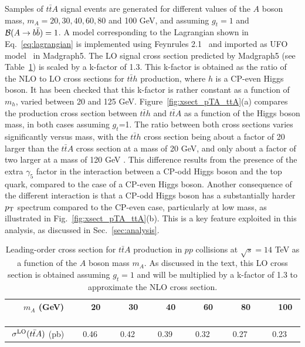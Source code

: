 \documentclass[preprintnumbers,superscriptaddress,nofootinbib,aps,prd,floatfix]{revtex4}
\newcommand{\pt}{p_{\rm{T}}}
\newcommand{\ttbar}{\ensuremath{t\bar{t}}}
\begin{document}
Samples of $\ttbar A$ signal events are generated for different values of the $A$ boson mass, $m_A = 20, 30,40, 60, 80$ and 100 GeV,
and assuming $g_t=1$ and ${\cal B}(A \to b\bar{b})=1$. A model corresponding to the Lagrangian shown in Eq.~\ref{eq:lagrangian} 
is implemented using Feynrules 2.1~\cite{Alloul:2013bka} and imported as UFO  model~\cite{Degrande:2011ua} in {\sc Madgraph5}.  
The LO signal cross section predicted by  {\sc Madgraph5} (see Table~\ref{tab:sigma_ttA}) is scaled by a k-factor of 1.3. This k-factor is obtained 
as the ratio of the NLO to LO cross sections for $\ttbar h$ production, where $h$ is a CP-even Higgs boson. It has been checked that this k-factor
is rather constant as a function of $m_h$, varied between 20 and 125 GeV.
Figure~\ref{fig:xsect_pTA_ttA}(a) compares the production cross section between $\ttbar h$ and $\ttbar A$ as a function of the Higgs boson
mass, in both cases assuming $g_t$=1. The ratio between both cross sections varies significantly versus mass, with the $\ttbar h$ cross section
being about a factor of 20 larger than the $\ttbar A$ cross section at a mass of 20 GeV, and only about a factor of two larger at a mass of 120 GeV \cite{Frederix:2011zi}.
This difference results from the presence of the extra $\gamma_5$ factor in the interaction between a CP-odd Higgs boson and the top quark,
compared to the case of a CP-even Higgs boson.
Another consequence of the different interaction is that a CP-odd Higgs boson has a  substantially harder $\pt$ spectrum compared to the  CP-even case,
particularly at low mass, as illustrated in Fig.~\ref{fig:xsect_pTA_ttA}(b). This is a key feature exploited in this analysis, as discussed in
Sec.~\ref{sec:analysis}.

\begin{table}[h] 
\begin{center} 
\begin{tabular}{ccccccc} 
\hline\hline
$\quad$ $m_A$ (GeV) $\quad$ & $\quad$ 20 $\quad$ & $\quad$ 30 $\quad$ & $\quad$ 40 $\quad$ & $\quad$ 60 $\quad$ & $\quad$ 80 $\quad$ & $\quad$ 100 $\quad$ \\
\hline
$\sigma^{\rm LO}(\ttbar A)$ (pb) & 0.46 & 0.42 & 0.39 & 0.32 & 0.27 & 0.23 \\
\hline\hline
\end{tabular} 
\caption{\small {Leading-order cross section for $\ttbar A$ production in $pp$ collisions at $\sqrt{s}=14$ TeV as a function of 
the $A$ boson mass $m_A$. As discussed in the text, this LO cross section is obtained assuming $g_t=1$ and will be 
multiplied by a k-factor of 1.3 to approximate the NLO cross section.}}
\label{tab:sigma_ttA} 
\end{center} 
\end{table} 
\end{document}
